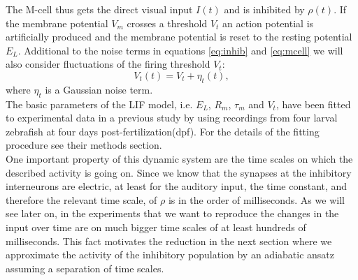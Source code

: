 	The M-cell thus gets the direct visual input $I(t)$ and is inhibited by $\rho(t)$.
	If the membrane potential $V_m$ crosses a threshold $V_t$ an action potential is artificially 
	produced and the membrane potential is reset to the resting potential $E_L$.
	Additional to the noise terms in equations \ref{eq:inhib} and \ref{eq:mcell} we will also 
	consider fluctuations of the firing threshold $V_t$:
	\begin{equation}
	V_t (t) = V_t + \eta_t(t),
	\label{eq:thrs}
	\end{equation}
	where $\eta_t$ is a Gaussian noise term.\\
	The basic parameters of the LIF model, i.e. $E_L$, $R_m$, $\tau_m$ and $V_t$, have been fitted to experimental data in a previous study by \cite{Koyama2016} using recordings from four larval zebrafish at four days post-fertilization(dpf).
	For the details of the fitting procedure see their methods section.\\
	One important property of this dynamic system are the time scales on which the described activity is going on.
	Since we know that the synapses at the inhibitory interneurons are electric, at least for the auditory input, the time constant, and therefore the relevant time scale, of $\rho$ is in the order of milliseconds.
	As we will see later on, in the experiments that we want to reproduce the changes in the input over time are on much bigger time scales of at least hundreds of milliseconds.
	This fact motivates the reduction in the next section where we approximate the activity of the inhibitory population by an adiabatic ansatz assuming a separation of time scales.
